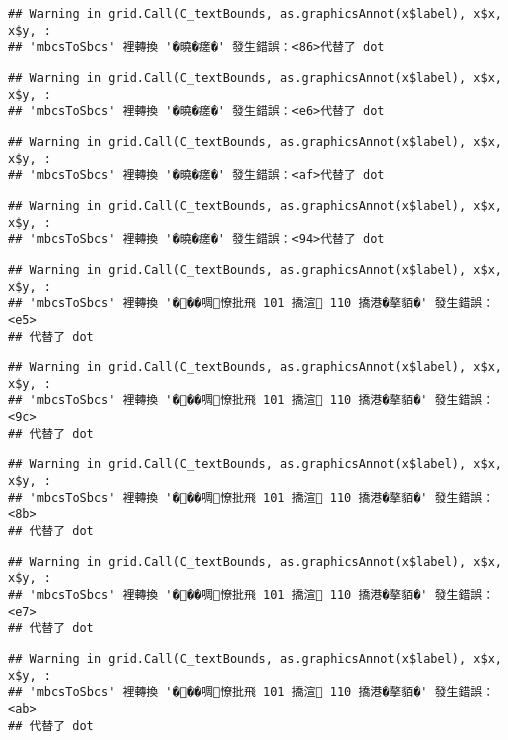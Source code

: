 \documentclass[
]{article}
\begin{document}
\begin{verbatim}
## Warning in grid.Call(C_textBounds, as.graphicsAnnot(x$label), x$x, x$y, :
## 'mbcsToSbcs' 裡轉換 '�曉�瘥�' 發生錯誤：<86>代替了 dot
\end{verbatim}

\begin{verbatim}
## Warning in grid.Call(C_textBounds, as.graphicsAnnot(x$label), x$x, x$y, :
## 'mbcsToSbcs' 裡轉換 '�曉�瘥�' 發生錯誤：<e6>代替了 dot
\end{verbatim}

\begin{verbatim}
## Warning in grid.Call(C_textBounds, as.graphicsAnnot(x$label), x$x, x$y, :
## 'mbcsToSbcs' 裡轉換 '�曉�瘥�' 發生錯誤：<af>代替了 dot
\end{verbatim}

\begin{verbatim}
## Warning in grid.Call(C_textBounds, as.graphicsAnnot(x$label), x$x, x$y, :
## 'mbcsToSbcs' 裡轉換 '�曉�瘥�' 發生錯誤：<94>代替了 dot
\end{verbatim}

\begin{verbatim}
## Warning in grid.Call(C_textBounds, as.graphicsAnnot(x$label), x$x, x$y, :
## 'mbcsToSbcs' 裡轉換 '���啁憭批飛 101 撟渲 110 撟港�摮貊�' 發生錯誤：<e5>
## 代替了 dot
\end{verbatim}

\begin{verbatim}
## Warning in grid.Call(C_textBounds, as.graphicsAnnot(x$label), x$x, x$y, :
## 'mbcsToSbcs' 裡轉換 '���啁憭批飛 101 撟渲 110 撟港�摮貊�' 發生錯誤：<9c>
## 代替了 dot
\end{verbatim}

\begin{verbatim}
## Warning in grid.Call(C_textBounds, as.graphicsAnnot(x$label), x$x, x$y, :
## 'mbcsToSbcs' 裡轉換 '���啁憭批飛 101 撟渲 110 撟港�摮貊�' 發生錯誤：<8b>
## 代替了 dot
\end{verbatim}

\begin{verbatim}
## Warning in grid.Call(C_textBounds, as.graphicsAnnot(x$label), x$x, x$y, :
## 'mbcsToSbcs' 裡轉換 '���啁憭批飛 101 撟渲 110 撟港�摮貊�' 發生錯誤：<e7>
## 代替了 dot
\end{verbatim}

\begin{verbatim}
## Warning in grid.Call(C_textBounds, as.graphicsAnnot(x$label), x$x, x$y, :
## 'mbcsToSbcs' 裡轉換 '���啁憭批飛 101 撟渲 110 撟港�摮貊�' 發生錯誤：<ab>
## 代替了 dot
\end{verbatim}
\end{document}
